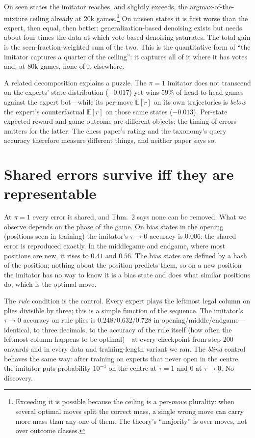 \documentclass[11pt]{article}
\newcommand{\Er}{\mathbb{E}[r]}
\newcommand{\tauz}{\tau\!\to\!0}
\begin{document}
On seen states the imitator reaches, and slightly exceeds, the argmax-of-the-mixture ceiling already at 20k games.\footnote{Exceeding it is possible because the ceiling is a per-\emph{move} plurality: when several optimal moves split the correct mass, a single wrong move can carry more mass than any one of them. The theory's ``majority'' is over moves, not over outcome classes.} On unseen states it is first worse than the expert, then equal, then better: generalization-based denoising exists but needs about four times the data at which vote-based denoising saturates. The total gain is the seen-fraction-weighted sum of the two. This is the quantitative form of ``the imitator captures a quarter of the ceiling'': it captures all of it where it has votes and, at 80k games, none of it elsewhere.

A related decomposition explains a puzzle. The $\pi=1$ imitator does not transcend on the experts' state distribution ($-0.017$) yet wins $59\%$ of head-to-head games against the expert bot---while its per-move $\Er$ on its own trajectories is \emph{below} the expert's counterfactual $\Er$ on those same states ($-0.013$). Per-state expected reward and game outcome are different objects: the timing of errors matters for the latter. The chess paper's rating and the taxonomy's query accuracy therefore measure different things, and neither paper says so.

\section{Shared errors survive iff they are representable}\label{sec:repr}

At $\pi=1$ every error is shared, and Thm.~2 says none can be removed. What we observe depends on the phase of the game. On bias states in the opening (positions seen in training) the imitator's $\tauz$ accuracy is $0.006$: the shared error is reproduced exactly. In the middlegame and endgame, where most positions are new, it rises to $0.41$ and $0.56$. The bias states are defined by a hash of the position; nothing about the position predicts them, so on a new position the imitator has no way to know it is a bias state and does what similar positions do, which is the optimal move.

The \emph{rule} condition is the control. Every expert plays the leftmost legal column on plies divisible by three; this is a simple function of the sequence. The imitator's $\tauz$ accuracy on rule plies is $0.248/0.632/0.728$ in opening/middle/endgame---identical, to three decimals, to the accuracy of the rule itself (how often the leftmost column happens to be optimal)---at every checkpoint from step 200 onwards and in every data and training-length variant we ran. The \emph{blind} control behaves the same way: after training on experts that never open in the centre, the imitator puts probability $10^{-4}$ on the centre at $\tau=1$ and $0$ at $\tauz$. No discovery.
\end{document}
